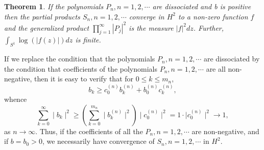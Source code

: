\documentclass{amsart}
\newtheorem{Th}{Theorem}[section]
\theoremstyle{definition}
\theoremstyle{remark}
\numberwithin{equation}{section}
\newcommand{\ds}{\displaystyle}
\newcommand{\1}{\mathbb{1}}
\begin{document}
 \begin{Th}\label{th2}
 If the polynomials $P_n, n=1,2,\cdots$ are dissociated and
 b is positive then the partial products $S_n, n=1,2,\cdots$ converge in $ H^2$ to a non-zero function
 $f$ and the generalized product $\prod_{j=1}^\infty |P_j|^2$ is the measure $|f|^2dz$.
 Further, $\ds \int_{S^1}\log (| f(z)|) dz$ is finite.
 \end{Th}

  If we replace the condition that the polynomials $P_n, n=1,2,\cdots$ are dissociated by the condition that coefficients of the polynomials $P_n, n=1,2,\cdots$ are all non-negative, then it is easy to verify that for $0 \leq k \leq m_n$,
  $$ b_k \geq c_0^{(n)}b_k^{(n)}+ b_0^{(n)}c_k^{(n)},$$
  whence
  $$\sum_{k=0}^\infty\mid b_k\mid^2 \geq (\sum_{k=0}^{m_n}\mid b_k^{(n)}\mid^2)\mid c_0^{(n)}\mid^2=1\cdot \mid c_0^{(n)}\mid^2 \rightarrow 1,$$ as $n \rightarrow \infty$. Thus, if the coefficients of all the $P_n, n=1,2,\cdots$ are non-negative, and if $b =b_0 > 0$, we necessarily have convergence of $S_n, n=1,2,\cdots $ in $H^2$.\\
\end{document}
